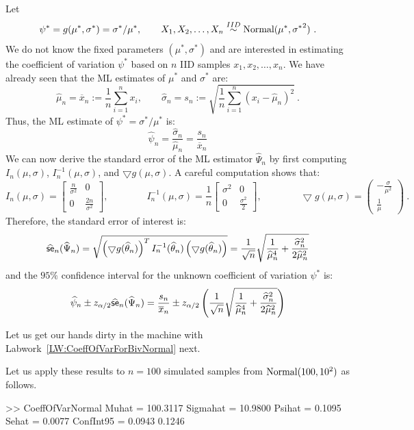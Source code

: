 \begin{example}\label{EX:CoeffOfVarForBivNormal}
Let 
$$
\psi^* = g(\mu^*,\sigma^*)=\sigma^*/\mu^*, \qquad X_1,X_2,\ldots,X_n \overset{IID}{\sim} \normal(\mu^*,{\sigma^*}^2) \ .
$$ 
We do not know the fixed parameters $(\mu^*,\sigma^*)$ and are interested in estimating the coefficient of variation $\psi^*$ based on $n$ IID samples $x_1,x_2,\ldots,x_n$.  We have already seen that the ML estimates of $\mu^*$ and $\sigma^*$ are:
\[
\widehat{\mu}_n =  \overline{x}_n := \frac{1}{n}\sum_{i=1}^n x_i,  \qquad 
\widehat{\sigma}_n = s_n := \sqrt{\frac{1}{n} \sum_{i=1}^n (x_i-\widehat{\mu}_n)^2} \ .
\]
Thus, the ML estimate of $\psi^*=\sigma^*/ \mu^*$ is:
\[
\widehat{\psi}_n =  \frac {\widehat{\sigma}_n}{\widehat{\mu}_n} = \frac {s_n}{\overline{x}_n}
\] 
We can now derive the standard error of the ML estimator $\widehat{\Psi}_n$ by first computing $I_n(\mu,\sigma)$, $I_n^{-1}(\mu,\sigma)$, and $\bigtriangledown g(\mu,\sigma)$.  A careful computation shows that:
\[
I_n(\mu,\sigma) = 
\begin{bmatrix}
\frac{n}{\sigma^2} & 0\\
0 & \frac{2n}{\sigma^2}
\end{bmatrix},
\qquad \qquad
I_n^{-1}(\mu,\sigma) = 
\frac{1}{n}
\begin{bmatrix}
{\sigma^2} & 0\\
0 & \frac{\sigma^2}{2}
\end{bmatrix},
\qquad \qquad
\bigtriangledown g(\mu,\sigma) =
\begin{pmatrix}
-\frac{\sigma}{\mu^2} \\
\frac{1}{\mu}
\end{pmatrix} \ .
\]
Therefore, the standard error of interest is:
\[
\widehat{\sf{se}}_n(\widehat{\Psi}_n) = \sqrt{ \left( \bigtriangledown g(\widehat{\theta}_n) \right)^T I_n^{-1}(\widehat{\theta}_n) \left( \bigtriangledown g(\widehat{\theta}_n) \right)} = 
\frac{1}{\sqrt{n}} \sqrt{\frac{1}{\widehat{\mu}_n^4} + \frac{\widehat{\sigma}_n^2}{2 \widehat{\mu}_n^2}}
\]
and the $95\%$ confidence interval for the unknown coefficient of variation $\psi^*$ is:
\[
\widehat{\psi}_n \pm z_{\alpha/2} {\widehat{\sf{se}}_n(\widehat{\Psi}_n)}  = 
\frac{s_n}{\overline{x}_n} \pm z_{\alpha/2} \left( \frac{1}{\sqrt{n}} \sqrt{\frac{1}{\widehat{\mu}_n^4} + \frac{\widehat{\sigma}_n^2}{2 \widehat{\mu}_n^2}} \right)
\]
\end{example}

Let us get our hands dirty in the machine with Labwork~\ref{LW:CoeffOfVarForBivNormal} next.
\begin{labwork} \label{LW:CoeffOfVarForBivNormal}
Let us apply these results to $n=100$ simulated samples from $\mbox{{\rm Normal}}(100,10^2)$ as follows.
{}
\begin{VrbM}
>> CoeffOfVarNormal
Muhat =  100.3117
Sigmahat =   10.9800
Psihat =    0.1095
Sehat =    0.0077
ConfInt95 =    0.0943    0.1246
\end{VrbM}
\end{labwork}
